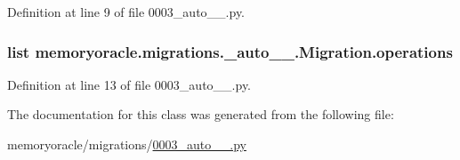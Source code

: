 Definition at line 9 of file 0003\+\_\+auto\+\_\+\_.\+py.

\hypertarget{classmemoryoracle_1_1migrations_1_10003__auto__20150402__2000_1_1Migration_af6549e1fb410ea57604d45ae16988cf4}{}
\subsubsection[{operations}]{\setlength{\rightskip}{0pt plus 5cm}list memoryoracle.\+migrations.\+\_\+auto\+\_\+\_.\+Migration.\+operations\hspace{0.3cm}{\ttfamily [static]}}\label{classmemoryoracle_1_1migrations_1_10003__auto__20150402__2000_1_1Migration_af6549e1fb410ea57604d45ae16988cf4}


Definition at line 13 of file 0003\+\_\+auto\+\_\+\_.\+py.



The documentation for this class was generated from the following file\+:\begin{DoxyCompactItemize}
\item 
memoryoracle/migrations/\hyperlink{0003__auto__20150402__2000_8py}{0003\+\_\+auto\+\_\+\_.\+py}\end{DoxyCompactItemize}
